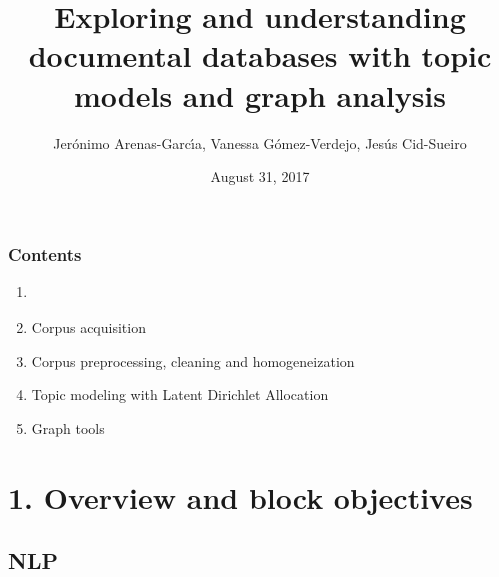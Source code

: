 \documentclass{beamer}
\title[TopicModel]{Exploring and understanding documental databases with topic models and graph analysis} %
\author{Jer\'onimo Arenas-Garc\'{\i}a, Vanessa G\'omez-Verdejo, Jes\'us Cid-Sueiro} %
\institute[UC3M] %
{
Universidad Carlos III de Madrid \\ %
\medskip
\textit{jeronimo.arenas@uc3m.es} %
}
\date{August 31, 2017}
\begin{document}
\begin{frame}
\titlepage %
\end{frame}


\begin{frame}

    \frametitle{Contents}

	\large

    \begin{enumerate}
  
    	\item {\bf \color{blue}{Overview and block objectives}}
    	\item Corpus acquisition
    	\item Corpus preprocessing, cleaning and homogeneization
    	\item Topic modeling with Latent Dirichlet Allocation
    	\item Graph tools
    
    \end{enumerate}

\end{frame}

\section{1. Overview and block objectives}
\subsection{NLP}
\end{document}
